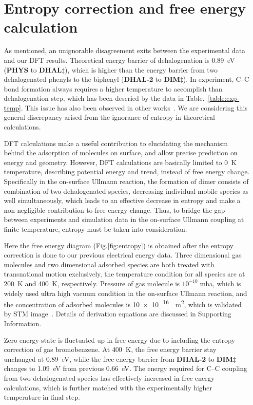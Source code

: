 \documentclass[aps,prb,reprint,amsmath,amssymb]{revtex4-1}
\newcommand{\zhzh}{\color{blue}}
\newcommand{\zhzh}{\color{blue}}
\newcommand{\sinfo}{Supporting Information}
\begin{document}
\section{Entropy correction and free energy calculation}
{\zhzh
As mentioned, an unignorable disagreement exits between the experimental data and our DFT results. Theoretical energy barrier of dehalogenation is \SI{0.89}{\electronvolt} (\textbf{PHYS} to \textbf{DHAL$\ddagger$}), which is  higher than the energy barrier from two dehalogenated phenyls to the biphenyl (\textbf{DHAL-2} to \textbf{DIM$\ddagger$}). In experiment, C--C bond formation always requires a higher temperature to accomplish than dehalogenation step, which has been descried by the data in Table.~\ref{table:exp-temp}. This issue has also been observed in other works~\cite{jacs2013, pccp2010}. We are considering this general discrepancy arised from the ignorance of entropy in theoretical calculations. 

DFT calculations make a useful contribution to elucidating the mechanism behind the adsorption of molecules on surface, and allow precise prediction on energy and geometry. However, DFT calculations are basically limited to \SI{0}{\kelvin} temperature, describing potential energy and trend, instead of free energy change. Specifically in the on-surface Ullmann reaction, the formation of dimer consists of combination of two dehalogenated species, decreasing individual mobile species as well simultaneously,  which leads to an effective decrease in entropy and make a non-negligible contribution to free energy change. Thus, to bridge the gap between experiments and simulation data in the on-surface Ullmann coupling at finite temperature, entropy must be taken into consideration. 

Here the free energy diagram (Fig.\ref{fig:entropy}) is obtained after the entropy correction is done to our previous electrical energy data. Three dimensional gas molecules and two dimensional adsorbed species are both treated with transnational motion exclusively, the temperature condition for all species are at \SI{200}{\kelvin} and \SI{400}{\kelvin}, respectively. Pressure of gas molecule is $10^{-10}$ mba, which is widely used ultra high vacuum condition in the on-surface Ullmann reaction, and the concentration of adsorbed molecules is \SI{10e-16}{\per\metre\squared}, which is validated by STM image~\cite{ullmann_67}. Details of derivation equations are discussed in \sinfo.

Zero energy state is fluctuated up in free energy due to including the entropy correction of gas bromobenzene. At \SI{400}{\kelvin}, the free energy barrier stay unchanged at \SI{0.89}{\electronvolt}, while the free energy barrier from \textbf{DHAL-2} to \textbf{DIM$\ddagger$} changes to \SI{1.09}{\electronvolt} from previous \SI{0.66}{\electronvolt}. The energy required for C--C coupling from two dehalogenated species has effectively increased in free energy calculations, which is further matched with the experimentally higher temperature in final step.

}
\end{document}
